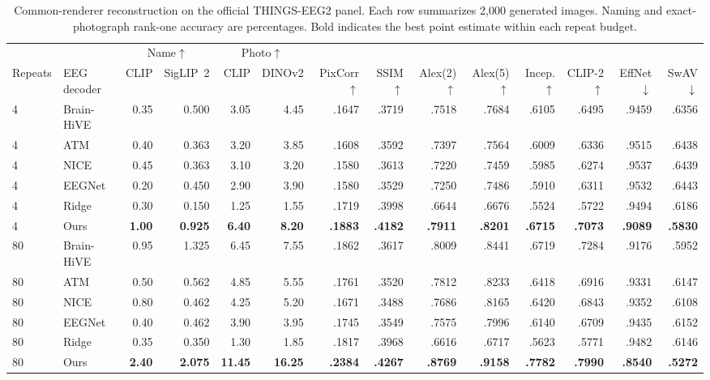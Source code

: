 \documentclass[letterpaper,10pt,conference]{IEEEtran}
\begin{document}
\begin{table}[t]
\centering
\caption{Common-renderer reconstruction on the official THINGS-EEG2 panel. Each row summarizes 2,000 generated images. Naming and exact-photograph rank-one accuracy are percentages. Bold indicates the best point estimate within each repeat budget.}
\label{tab:common}
\small
\setlength{\tabcolsep}{2.8pt}
\begin{tabular}{llrrrrrrrrrrrr}
\toprule
 & & \multicolumn{2}{c}{Name$\uparrow$} & \multicolumn{2}{c}{Photo$\uparrow$} & & & & & & & & \\
\cmidrule(lr){3-4}\cmidrule(lr){5-6}
Repeats & EEG decoder & CLIP & SigLIP~2 & CLIP & DINOv2 & PixCorr$\uparrow$ & SSIM$\uparrow$ & Alex(2)$\uparrow$ & Alex(5)$\uparrow$ & Incep.$\uparrow$ & CLIP-2$\uparrow$ & EffNet$\downarrow$ & SwAV$\downarrow$ \\
\midrule
4 & Brain-HiVE & 0.35 & 0.500 & 3.05 & 4.45 & .1647 & .3719 & .7518 & .7684 & .6105 & .6495 & .9459 & .6356 \\
4 & ATM & 0.40 & 0.363 & 3.20 & 3.85 & .1608 & .3592 & .7397 & .7564 & .6009 & .6336 & .9515 & .6438 \\
4 & NICE & 0.45 & 0.363 & 3.10 & 3.20 & .1580 & .3613 & .7220 & .7459 & .5985 & .6274 & .9537 & .6439 \\
4 & EEGNet & 0.20 & 0.450 & 2.90 & 3.90 & .1580 & .3529 & .7250 & .7486 & .5910 & .6311 & .9532 & .6443 \\
4 & Ridge & 0.30 & 0.150 & 1.25 & 1.55 & .1719 & .3998 & .6644 & .6676 & .5524 & .5722 & .9494 & .6186 \\
4 & Ours & \textbf{1.00} & \textbf{0.925} & \textbf{6.40} & \textbf{8.20} & \textbf{.1883} & \textbf{.4182} & \textbf{.7911} & \textbf{.8201} & \textbf{.6715} & \textbf{.7073} & \textbf{.9089} & \textbf{.5830} \\
\midrule
80 & Brain-HiVE & 0.95 & 1.325 & 6.45 & 7.55 & .1862 & .3617 & .8009 & .8441 & .6719 & .7284 & .9176 & .5952 \\
80 & ATM & 0.50 & 0.562 & 4.85 & 5.55 & .1761 & .3520 & .7812 & .8233 & .6418 & .6916 & .9331 & .6147 \\
80 & NICE & 0.80 & 0.462 & 4.25 & 5.20 & .1671 & .3488 & .7686 & .8165 & .6420 & .6843 & .9352 & .6108 \\
80 & EEGNet & 0.40 & 0.462 & 3.90 & 3.95 & .1745 & .3549 & .7575 & .7996 & .6140 & .6709 & .9435 & .6152 \\
80 & Ridge & 0.35 & 0.350 & 1.30 & 1.85 & .1817 & .3968 & .6616 & .6717 & .5623 & .5771 & .9482 & .6146 \\
80 & Ours & \textbf{2.40} & \textbf{2.075} & \textbf{11.45} & \textbf{16.25} & \textbf{.2384} & \textbf{.4267} & \textbf{.8769} & \textbf{.9158} & \textbf{.7782} & \textbf{.7990} & \textbf{.8540} & \textbf{.5272} \\
\bottomrule
\end{tabular}
\end{table}
\end{document}
